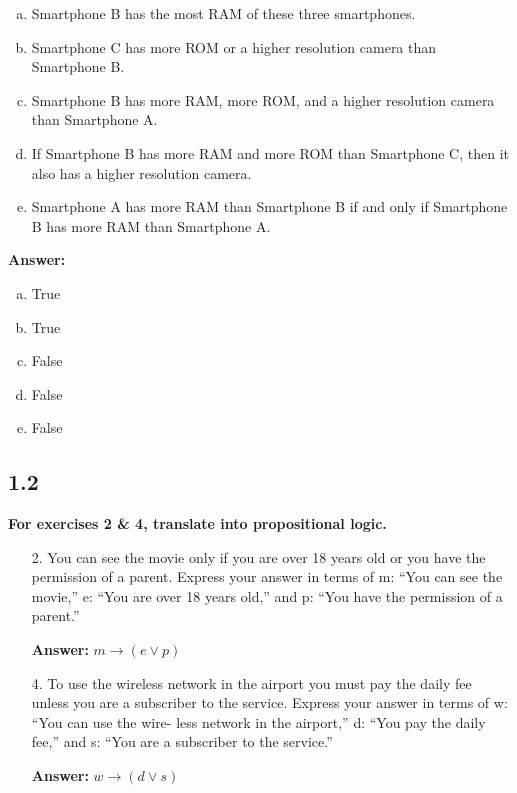 \begin{itemize}
\begin{enumerate}[a.]
    \item Smartphone B has the most RAM of these three smartphones.
    \item Smartphone C has more ROM or a higher resolution camera than Smartphone B.
    \item Smartphone B has more RAM, more ROM, and a higher resolution camera than Smartphone A.
    \item If Smartphone B has more RAM and more ROM than Smartphone C, then it also has a higher resolution camera.
    \item Smartphone A has more RAM than Smartphone B if and only if Smartphone B has more RAM than Smartphone A.
\end{enumerate}
\textbf{Answer:}
\begin{enumerate}[a.]
    \item True
    \item True
    \item False
    \item False
    \item False
\end{enumerate}
\end{itemize}
\subsection{1.2}
\textbf{For exercises 2 \& 4, translate into propositional logic.}
\begin{itemize}
    \item [2.]You can see the movie only if you are over 18 years old or you have the permission of a parent. Express your answer in terms of m: “You can see the movie,” e: “You are over 18 years old,” and p: “You have the permission of a parent.”

          \textbf{Answer:} $m \to (e \lor p)$
    \item[4.]To use the wireless network in the airport you must pay the daily fee unless you are a subscriber to the service. Express your answer in terms of w: “You can use the wire-
          less network in the airport,” d: “You pay the daily fee,” and s: “You are a subscriber to the service.”

          \textbf{Answer:} $w \to (d \lor s)$
\end{itemize}

